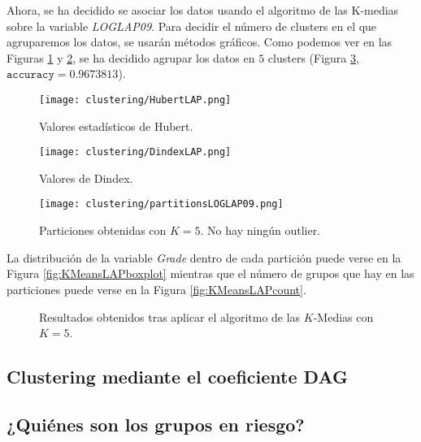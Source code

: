 Ahora, se ha decidido se asociar los datos usando el algoritmo de las K-medias sobre la variable \emph{LOGLAP09}. Para decidir el número de clusters en el que agruparemos los datos, se usarán métodos gráficos. Como podemos ver en las Figuras \ref{fig:indiceshubertLAP} y \ref{fig:indicesdindexLAP}, se ha decidido agrupar los datos en $5$ clusters (Figura \ref{fig:KMeansLAP}, $\texttt{accuracy} = 0.9673813$).

\begin{figure}[H]
    \centering
    \texttt{[image: clustering/HubertLAP.png]}
    \caption{Valores estadísticos de Hubert.}
    \label{fig:indiceshubertLAP}
\end{figure}

\begin{figure}[H]
    \centering
    \texttt{[image: clustering/DindexLAP.png]}
    \caption{Valores de Dindex.}
    \label{fig:indicesdindexLAP}
\end{figure}

\begin{figure}[H]
    \centering
    \texttt{[image: clustering/partitionsLOGLAP09.png]}
    \caption{Particiones obtenidas con $K = 5$. No hay ningún outlier.}
    \label{fig:KMeansLAP}
\end{figure}

La distribución de la variable \emph{Grade} dentro de cada partición puede verse en la Figura \ref{fig:KMeansLAPboxplot} mientras que el número de grupos que hay en las particiones puede verse en la Figura \ref{fig:KMeansLAPcount}.

\begin{figure}[H]
\centering
{}\qquad
{}%
\caption{Resultados obtenidos tras aplicar el algoritmo de las $K$-Medias con $K = 5$.}
\label{fig:KMeansLAPdetails}
\end{figure}

\subsection{Clustering mediante el coeficiente DAG}

\subsection{¿Quiénes son los grupos en riesgo?}\label{sec:badstudents}

